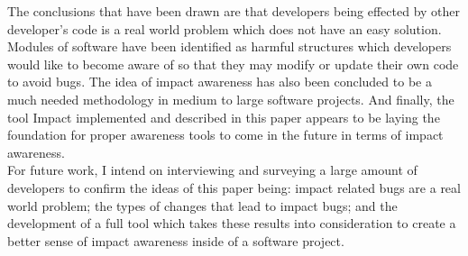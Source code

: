 \documentclass[conference]{IEEEtran}
\begin{document}
The conclusions that have been drawn are that developers being effected by other developer's
code is a real world problem which does not have an easy solution. Modules of software
have been identified as harmful structures which developers would like to become
aware of so that they may modify or update their own code to avoid bugs. The idea of
impact awareness has also been concluded to be a much needed methodology in 
medium to large software projects. And finally, the tool Impact implemented and
described in this paper appears to be laying the foundation for proper awareness
tools to come in the future in terms of impact awareness.\\

For future work, I intend on interviewing and surveying a large amount of developers
to confirm the ideas of this paper being: impact related bugs are a real world problem; the
types of changes that lead to impact bugs; and the development of a full tool which takes
these results into consideration to create a better sense of impact awareness inside of
a software project.





\end{document}
